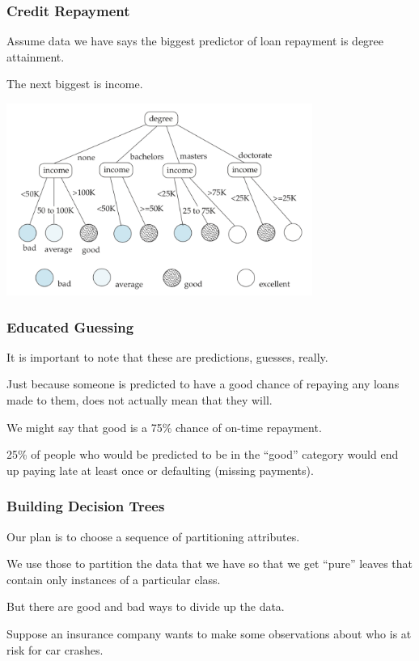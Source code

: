 \begin{frame}
\frametitle{Credit Repayment}

Assume data we have says the biggest predictor of loan repayment is degree attainment. 

The next biggest is income. 


\begin{center}
\includegraphics[width=0.75\textwidth]{images/classification-tree}
\end{center}

\end{frame}


\begin{frame}
\frametitle{Educated Guessing}

It is important to note that these are predictions, guesses, really. 

Just because someone is predicted to have a good chance of repaying any loans made to them, does not actually mean that they will. 

We might say that good is a 75\% chance of on-time repayment. 

25\% of people who would be predicted to be in the ``good'' category would end up paying late at least once or defaulting (missing payments).

\end{frame}

\begin{frame}
\frametitle{Building Decision Trees}

Our plan is to choose a sequence of partitioning attributes. 

We use those to partition the data that we have so that we get ``pure'' leaves that contain only instances of a particular class. 

But there are good and bad ways to divide up the data. 

Suppose an insurance company wants to make some observations about who is at risk for car crashes. 

\end{frame}

